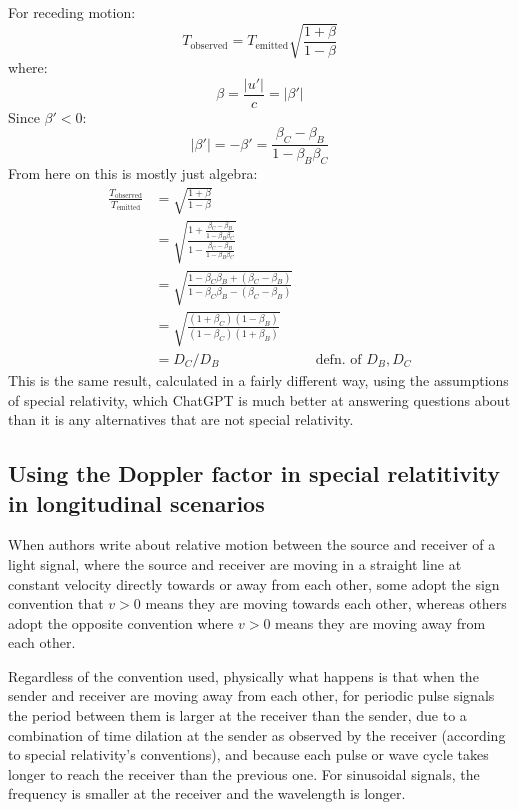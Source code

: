 \documentclass[a4paper]{article}
\theoremstyle{plain}
\theoremstyle{definition}
\begin{document}
For receding motion:
\begin{equation}
T_{\text{observed}} = T_{\text{emitted}} \sqrt{ \frac{1+\beta}{1-\beta} }
\end{equation}
where:
\begin{equation}
\beta = \frac{|u'|}{c} = |\beta'|
\end{equation}
Since $\beta' < 0$:
\begin{equation}
|\beta'| = -\beta' = \frac{\beta_C - \beta_B}{1 - \beta_B \beta_C}
\end{equation}
From here on this is mostly just algebra:
\begin{align*}
\frac{T_{\text{observed}}}{T_{\text{emitted}}}
  & = \sqrt{ \frac{1+\beta}{1-\beta} } \\
  & = \sqrt{ \frac{1 + \frac{\beta_C - \beta_B}{1 - \beta_B \beta_C}}{1 - \frac{\beta_C - \beta_B}{1 - \beta_B \beta_C}} } \\
  & = \sqrt{ \frac{1 - \beta_C \beta_B + (\beta_C - \beta_B)}{1 - \beta_C \beta_B - (\beta_C - \beta_B)} } \\
  & = \sqrt{ \frac{(1 + \beta_C) (1 - \beta_B)}{(1 - \beta_C) (1 + \beta_B)} } \\
  & = D_C / D_B & & \text{defn. of $D_B, D_C$}
\end{align*}
This is the same result, calculated in a fairly different way, using
the assumptions of special relativity, which ChatGPT is much better at
answering questions about than it is any alternatives that are not
special relativity.


\subsection{Using the Doppler factor in special relatitivity in longitudinal scenarios}
\label{sec:DopplerFactorSignConvention}

When authors write about relative motion between the source and
receiver of a light signal, where the source and receiver are moving
in a straight line at constant velocity directly towards or away from
each other, some adopt the sign convention that $v > 0$ means they are
moving towards each other, whereas others adopt the opposite
convention where $v > 0$ means they are moving away from each other.

Regardless of the convention used, physically what happens is that
when the sender and receiver are moving away from each other, for
periodic pulse signals the period between them is larger at the
receiver than the sender, due to a combination of time dilation at the
sender as observed by the receiver (according to special relativity's
conventions), and because each pulse or wave cycle takes longer to
reach the receiver than the previous one.  For sinusoidal signals, the
frequency is smaller at the receiver and the wavelength is longer.
\end{document}
